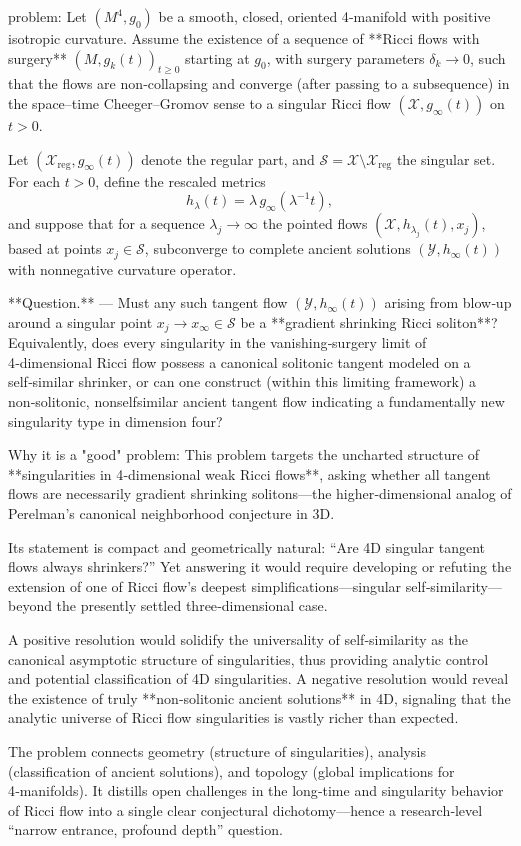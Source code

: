 problem:  
Let \( (M^4, g_0) \) be a smooth, closed, oriented 4‑manifold with positive isotropic curvature.  
Assume the existence of a sequence of **Ricci flows with surgery** \( (M, g_k(t))_{t\ge0} \) starting at \(g_0\), with surgery parameters \(\delta_k \to 0\), such that the flows are non‑collapsing and converge (after passing to a subsequence) in the space–time Cheeger–Gromov sense to a singular Ricci flow \( (\mathcal{X}, g_\infty(t)) \) on \(t>0\).  

Let \((\mathcal{X}_{\mathrm{reg}}, g_\infty(t))\) denote the regular part, and \(\mathcal{S} = \mathcal{X} \setminus \mathcal{X}_{\mathrm{reg}}\) the singular set. For each \(t>0\), define the rescaled metrics  
\[
h_\lambda(t) = \lambda\, g_\infty(\lambda^{-1}t),
\]
and suppose that for a sequence \(\lambda_j \to \infty\) the pointed flows \((\mathcal{X}, h_{\lambda_j}(t), x_j)\), based at points \(x_j \in \mathcal{S}\), subconverge to complete ancient solutions \( (\mathcal{Y}, h_\infty(t)) \) with nonnegative curvature operator.  

**Question.** —  
Must any such tangent flow \( (\mathcal{Y}, h_\infty(t)) \) arising from blow‑up around a singular point \(x_j \to x_\infty \in \mathcal{S}\) be a **gradient shrinking Ricci soliton**?  
Equivalently, does every singularity in the vanishing‑surgery limit of 4‑dimensional Ricci flow possess a canonical solitonic tangent modeled on a self‑similar shrinker, or can one construct (within this limiting framework) a non‑solitonic, nonselfsimilar ancient tangent flow indicating a fundamentally new singularity type in dimension four?

Why it is a "good" problem:  
This problem targets the uncharted structure of **singularities in 4‑dimensional weak Ricci flows**, asking whether all tangent flows are necessarily gradient shrinking solitons—the higher‑dimensional analog of Perelman’s canonical neighborhood conjecture in 3D.  

Its statement is compact and geometrically natural: “Are 4D singular tangent flows always shrinkers?” Yet answering it would require developing or refuting the extension of one of Ricci flow’s deepest simplifications—singular self‑similarity—beyond the presently settled three‑dimensional case.  

A positive resolution would solidify the universality of self‑similarity as the canonical asymptotic structure of singularities, thus providing analytic control and potential classification of 4D singularities. A negative resolution would reveal the existence of truly **non‑solitonic ancient solutions** in 4D, signaling that the analytic universe of Ricci flow singularities is vastly richer than expected.  

The problem connects geometry (structure of singularities), analysis (classification of ancient solutions), and topology (global implications for 4‑manifolds). It distills open challenges in the long‑time and singularity behavior of Ricci flow into a single clear conjectural dichotomy—hence a research‑level “narrow entrance, profound depth” question.